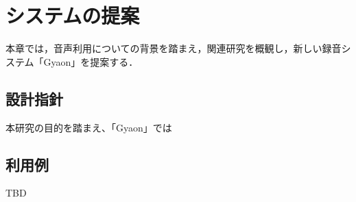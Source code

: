 \chapter{システムの提案}
\label{chap:proposal}

本章では，音声利用についての背景を踏まえ，関連研究を概観し，新しい録音システム「Gyaon」を提案する．

\newpage

\section{設計指針}

本研究の目的を踏まえ、「Gyaon」では


\section{利用例}

TBD
